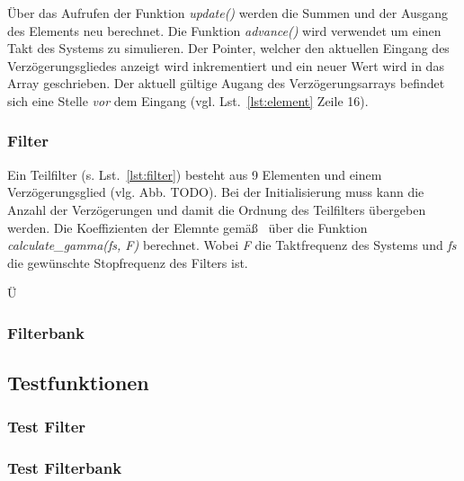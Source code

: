 Über das Aufrufen der Funktion \emph{update()} werden die Summen und der Ausgang des Elements neu berechnet. Die Funktion \emph{advance()} wird verwendet um einen Takt des Systems zu simulieren. Der Pointer, welcher den aktuellen Eingang des Verzögerungsgliedes anzeigt wird inkrementiert und ein neuer Wert wird in das Array geschrieben. Der aktuell gültige Augang des Verzögerungsarrays befindet sich eine Stelle \emph{vor} dem Eingang (vgl. Lst.~\ref{lst:element} Zeile 16).




\subsubsection{Filter}\label{sec:impl_Filter}
Ein Teilfilter (s. Lst.~\ref{lst:filter}) besteht aus 9 Elementen und einem Verzögerungsglied (vlg. Abb. TODO). Bei der Initialisierung muss kann die Anzahl der Verzögerungen und damit die Ordnung des Teilfilters übergeben werden. Die Koeffizienten der Elemnte gemäß~\cite{gaszi1983} über die Funktion \emph{calculate_gamma(fs, F)} berechnet. Wobei \emph{F} die Taktfrequenz des Systems und \emph{fs} die gewünschte Stopfrequenz des Filters ist.

Ü


\subsubsection{Filterbank}\label{sec:impl_bank}

\subsection{Testfunktionen}\label{sec:impl_test}

\subsubsection{Test Filter}\label{sec:impl_testFilter}

\subsubsection{Test Filterbank}\label{sec:impl_testBank}

